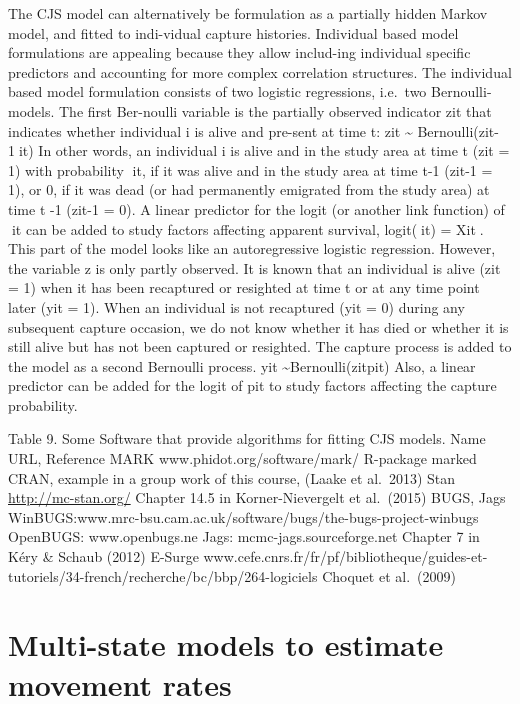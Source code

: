 \documentclass[
]{book}
\begin{document}
The CJS model can alternatively be formulation as a partially hidden Markov model, and fitted to indi-vidual capture histories. Individual based model formulations are appealing because they allow includ-ing individual specific predictors and accounting for more complex correlation structures. The individual based model formulation consists of two logistic regressions, i.e.~two Bernoulli-models. The first Ber-noulli variable is the partially observed indicator zit that indicates whether individual i is alive and pre-sent at time t:
zit \textasciitilde{} Bernoulli(zit-1it)
In other words, an individual i is alive and in the study area at time t (zit = 1) with probability it, if it was alive and in the study area at time t-1 (zit-1 = 1), or 0, if it was dead (or had permanently emigrated from the study area) at time t -1 (zit-1 = 0). A linear predictor for the logit (or another link function) of it can be added to study factors affecting apparent survival, logit(it) = Xit. This part of the model looks like an autoregressive logistic regression. However, the variable z is only partly observed. It is known that an individual is alive (zit = 1) when it has been recaptured or resighted at time t or at any time point later (yit = 1). When an individual is not recaptured (yit = 0) during any subsequent capture occasion, we do not know whether it has died or whether it is still alive but has not been captured or resighted. The capture process is added to the model as a second Bernoulli process.
yit \textasciitilde Bernoulli(zitpit)
Also, a linear predictor can be added for the logit of pit to study factors affecting the capture probability.

Table 9. Some Software that provide algorithms for fitting CJS models.
Name URL, Reference
MARK www.phidot.org/software/mark/
R-package marked CRAN, example in a group work of this course, (Laake et al.~2013)
Stan \url{http://mc-stan.org/}
Chapter 14.5 in Korner-Nievergelt et al.~(2015)
BUGS, Jags WinBUGS:www.mrc-bsu.cam.ac.uk/software/bugs/the-bugs-project-winbugs
OpenBUGS: www.openbugs.ne
Jags: mcmc-jags.sourceforge.net
Chapter 7 in Kéry \& Schaub (2012)
E-Surge www.cefe.cnrs.fr/fr/pf/bibliotheque/guides-et-tutoriels/34-french/recherche/bc/bbp/264-logiciels
Choquet et al.~(2009)

\hypertarget{multi-state-models-to-estimate-movement-rates}{%
\section{Multi-state models to estimate movement rates}\label{multi-state-models-to-estimate-movement-rates}}
\end{document}
